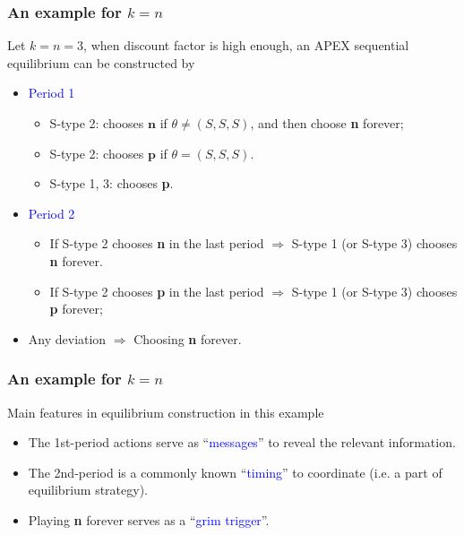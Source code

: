 \documentclass[9pt,handout]{beamer}
\begin{document}
\begin{frame}
  \frametitle{An example for $k=n$}
\begin{center}
\end{center}

  
Let \alert{$k=n=3$}, when discount factor is high enough, an APEX sequential equilibrium can be constructed by
\begin{itemize}

\item \textcolor{blue}{Period 1}
\begin{itemize}
\item S-type 2: chooses $\textbf{n}$ if $\theta\neq (S,S,S)$, and then choose \alert{\textbf{n} forever};
\item S-type 2: chooses $\textbf{p}$ if $\theta=(S,S,S)$.
\item S-type 1, 3: chooses \textbf{p}.
\end{itemize}

\item \textcolor{blue}{Period 2}
\begin{itemize}
\item If S-type 2 chooses \textbf{n} in the last period $\Rightarrow$ S-type 1 (or S-type 3) chooses \alert{\textbf{n} forever}.
\item If S-type 2 chooses \textbf{p} in the last period $\Rightarrow$ S-type 1 (or S-type 3) chooses \textbf{p} forever; 
\end{itemize}
 
 \item Any deviation $\Rightarrow$ Choosing \alert<1->{\textbf{n} forever}.
\end{itemize}

\end{frame}


\begin{frame}
  \frametitle{An example for $k=n$}
Main features in equilibrium construction in this example
\begin{itemize}
\item The \alert{1st-period} actions serve as ``\textcolor{blue}{messages}'' to reveal the relevant information.
\item The \alert{2nd-period} is a commonly known ``\textcolor{blue}{timing}'' to coordinate (i.e. a part of equilibrium strategy).
\item \alert{Playing \textbf{n} forever} serves as a ``\textcolor{blue}{grim trigger}''.
\end{itemize}  
\end{frame}
\end{document}
